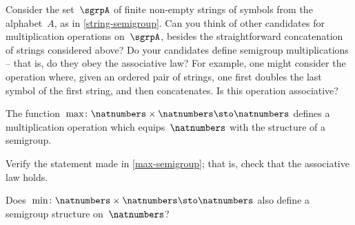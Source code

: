
\begin{exercise}
  \label{ex:alphabet}
  Consider the set~$\sgrpA$ of finite non-empty strings of symbols from the alphabet~$A$, as in \cref{string-semigroup}. Can you think of other candidates for multiplication operations on~$\sgrpA$, besides the straightforward concatenation of strings considered above? Do your candidates define semigroup multiplications -- that is, do they obey the associative law?
  For example, one might consider the operation where, given an ordered pair of strings, one first doubles the last symbol of the first string, and then concatenates. Is this operation associative?
\end{exercise}
\begin{solution}
\end{solution}


\begin{example}
  \label{max-semigroup}
  The function~$\max \colon \natnumbers \times \natnumbers \sto \natnumbers$ defines a multiplication operation which equips~$\natnumbers$ with the structure of a semigroup.
\end{example}

\begin{exercise}
  \label{ex:max-semigroup}
  Verify the statement made in \cref{max-semigroup}; that is, check that the associative law holds.

  Does~$\min \colon \natnumbers \times \natnumbers \sto \natnumbers$ also define a semigroup structure on~$\natnumbers$?
\end{exercise}
\begin{solution}
\end{solution}



